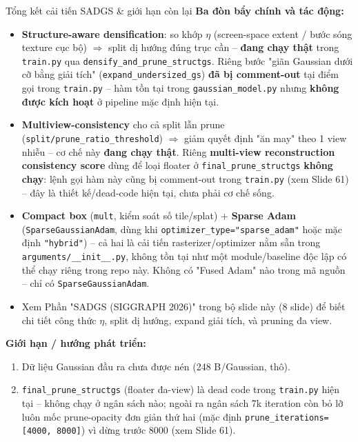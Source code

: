 \begin{frame}{Tổng kết cải tiến SADGS \& giới hạn còn lại}
\textbf{Ba đòn bẩy chính và tác động:}
\begin{itemize}
    \item \textbf{Structure-aware densification}: so khớp $\eta$ (screen-space extent / bước sóng texture cục bộ) $\Rightarrow$ split dị hướng đúng trục cần -- \textbf{đang chạy thật} trong \texttt{train.py} qua \texttt{densify\_and\_prune\_structgs}. Riêng bước "giãn Gaussian dưới cỡ bằng giải tích" (\texttt{expand\_undersized\_gs}) \textbf{đã bị comment-out} tại điểm gọi trong \texttt{train.py} -- hàm tồn tại trong \texttt{gaussian\_model.py} nhưng \textbf{không được kích hoạt} ở pipeline mặc định hiện tại.
    \item \textbf{Multiview-consistency} cho cả split lẫn prune (\texttt{split/prune\_ratio\_threshold}) $\Rightarrow$ giảm quyết định "ăn may" theo 1 view nhiễu -- cơ chế này \textbf{đang chạy thật}. Riêng \textbf{multi-view reconstruction consistency score} dùng để loại floater ở \texttt{final\_prune\_structgs} \textbf{không chạy}: lệnh gọi hàm này cũng bị comment-out trong \texttt{train.py} (xem Slide 61) -- đây là thiết kế/dead-code hiện tại, chưa phải cơ chế sống.
    \item \textbf{Compact box} (\texttt{mult}, kiểm soát số tile/splat) + \textbf{Sparse Adam} (\texttt{SparseGaussianAdam}, dùng khi \texttt{optimizer\_type="sparse\_adam"} hoặc mặc định \texttt{"hybrid"}) -- cả hai là cải tiến rasterizer/optimizer nằm sẵn trong \texttt{arguments/\_\_init\_\_.py}, không tồn tại như một module/baseline độc lập có thể chạy riêng trong repo này. Không có "Fused Adam" nào trong mã nguồn -- chỉ có \texttt{SparseGaussianAdam}.
    \item Xem Phần "SADGS (SIGGRAPH 2026)" trong bộ slide này (8 slide) để biết chi tiết công thức $\eta$, split dị hướng, expand giải tích, và pruning đa view.
\end{itemize}
\vspace{2mm}
\textbf{Giới hạn / hướng phát triển:}
\begin{enumerate}
    \item Dữ liệu Gaussian đầu ra chưa được nén (248 B/Gaussian, thô).
    \item \texttt{final\_prune\_structgs} (floater đa-view) là dead code trong \texttt{train.py} hiện tại -- không chạy ở ngân sách nào; ngoài ra ngân sách 7k iteration còn bỏ lỡ luôn mốc prune-opacity đơn giản thứ hai (mặc định \texttt{prune\_iterations=[4000, 8000]}) vì dừng trước 8000 (xem Slide 61).

\end{enumerate}
\end{frame}
